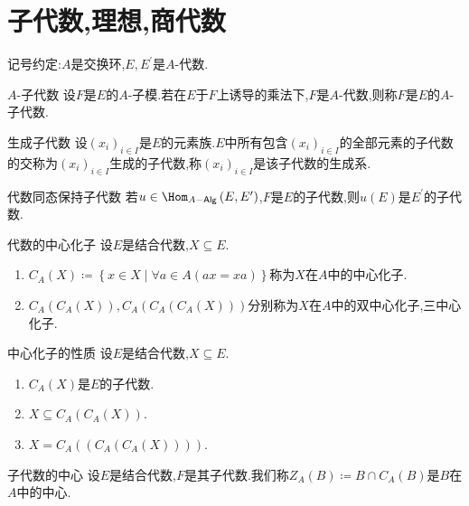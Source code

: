\section{子代数,理想,商代数}

记号约定:$A$是交换环,$E,E^{\prime}$是$A$-代数.

\begin{definition}{$A$-子代数}{}
	设$F$是$E$的$A$-子模.若在$E$于$F$上诱导的乘法下,$F$是$A$-代数,则称$F$是$E$的$A$-子代数.
\end{definition}

\begin{definition}{生成子代数}{}
	设$\left(x_{i}\right)_{i\in I}$是$E$的元素族.$E$中所有包含$\left(x_{i}\right)_{i\in I}$的全部元素的子代数的交称为$\left(x_{i}\right)_{i\in I}$生成的子代数,称$\left(x_{i}\right)_{i\in I}$是该子代数的生成系.
\end{definition}

\begin{proposition}{代数同态保持子代数}{}
	若$u\in\Hom_{A-\mathsf{Alg}}\left(E,E^{\prime}\right)$,$F$是$E$的子代数,则$u\left(E\right)$是$E^{\prime}$的子代数.
\end{proposition}

\begin{definition}{代数的中心化子}{}
	设$E$是结合代数,$X\subseteq E$.
	\begin{enumerate}
		\item $C_{A}\left(X\right)\coloneq\left\{x\in X\middle|\forall a\in A\left(ax=xa\right)\right\}$称为$X$在$A$中的中心化子.
		\item $C_{A}\left(C_{A}\left(X\right)\right),C_{A}\left(C_{A}\left(C_{A}\left(X\right)\right)\right)$分别称为$X$在$A$中的双中心化子,三中心化子.
	\end{enumerate}
\end{definition}

\begin{proposition}{中心化子的性质}{}
	设$E$是结合代数,$X\subseteq E$.
	\begin{enumerate}
		\item $C_{A}\left(X\right)$是$E$的子代数.
		\item $X\subseteq C_{A}\left(C_{A}\left(X\right)\right)$.
		\item $X=C_{A}\left(\left(C_{A}\left(C_{A}\left(X\right)\right)\right)\right)$.
	\end{enumerate}
\end{proposition}

\begin{definition}{子代数的中心}{}
	设$E$是结合代数,$F$是其子代数.我们称$Z_{A}\left(B\right)\coloneq B\cap C_{A}\left(B\right)$是$B$在$A$中的中心.
\end{definition}

